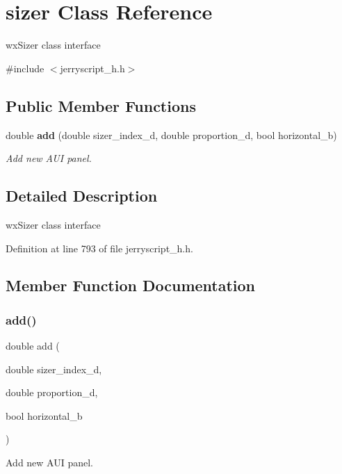 \section{sizer Class Reference}
\label{classsizer}


wx\+Sizer class interface  




{\ttfamily \#include $<$jerryscript\+\_\+h.\+h$>$}

\subsection*{Public Member Functions}
\begin{DoxyCompactItemize}
\item 
double \textbf{ add} (double sizer\+\_\+index\+\_\+d, double proportion\+\_\+d, bool horizontal\+\_\+b)
\begin{DoxyCompactList}\small\item\em Add new A\+UI panel. \end{DoxyCompactList}\end{DoxyCompactItemize}


\subsection{Detailed Description}
wx\+Sizer class interface 

Definition at line 793 of file jerryscript\+\_\+h.\+h.



\subsection{Member Function Documentation}
\mbox{\label{classsizer_a48f0ed15ee95563920d7e4cd551bebe8}} 
\subsubsection{add()}
{\footnotesize\ttfamily double add (\begin{DoxyParamCaption}\item[{double}]{sizer\+\_\+index\+\_\+d,  }\item[{double}]{proportion\+\_\+d,  }\item[{bool}]{horizontal\+\_\+b }\end{DoxyParamCaption})}



Add new A\+UI panel. 


